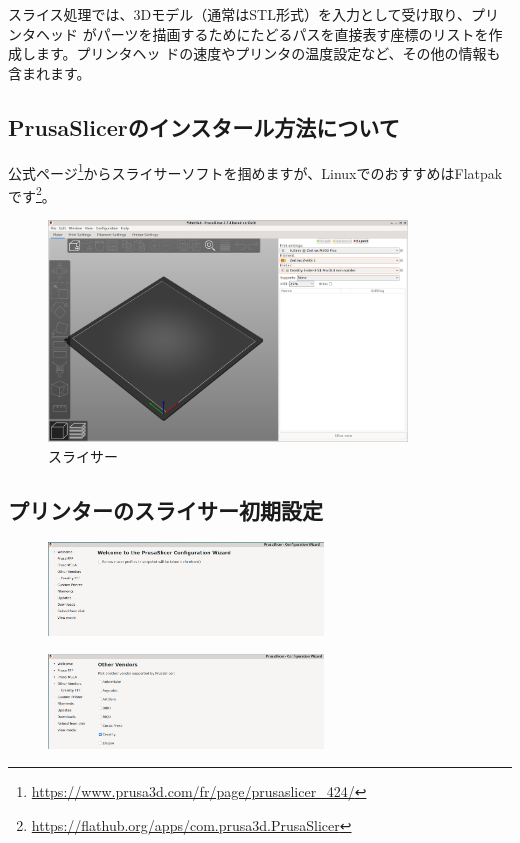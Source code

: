 \documentclass[10pt,a4paper,onecolumn,notitlepage,oneside,dvipdfmx]{article}
\begin{document}
スライス処理では、3Dモデル（通常はSTL形式）を入力として受け取り、プリンタヘッド
がパーツを描画するためにたどるパスを直接表す座標のリストを作成します。プリンタヘッ
ドの速度やプリンタの温度設定など、その他の情報も含まれます。

\subsection{PrusaSlicerのインスタール方法について}
\label{sec:orgc279400}
公式ページ\footnote{\url{https://www.prusa3d.com/fr/page/prusaslicer\_424/}}からスライサーソフトを掴めますが、LinuxでのおすすめはFlatpakです\footnote{\url{https://flathub.org/apps/com.prusa3d.PrusaSlicer}}。

\begin{figure}[htbp]
\centering
\includegraphics[width=0.85\textwidth]{img/ps.png}
\caption{スライサー}
\end{figure}

\subsection{プリンターのスライサー初期設定}
\label{sec:org0146f43}
\begin{figure}[htbp]
\centering
\includegraphics[width=0.65\textwidth]{img/welcome.png}
\end{figure}

\begin{figure}[htbp]
\centering
\includegraphics[width=0.65\textwidth]{img/crea.png}
\end{figure}
\end{document}
